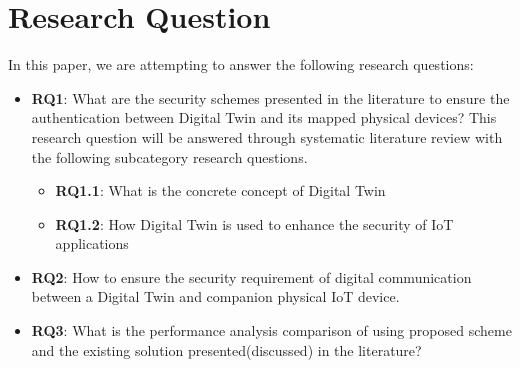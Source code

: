 \section{Research Question}
In this paper, we are attempting to answer the following research questions: 
\begin{itemize}

    \item \textbf{RQ1}: What are the security schemes presented in the literature to ensure the authentication between Digital Twin and its mapped physical devices? 
    This research question will be answered through systematic literature review with the following subcategory research questions.
    \begin{itemize}
        \item{ \textbf{RQ1.1}: What is the concrete concept of Digital Twin}
        \item{ \textbf{RQ1.2}: How Digital Twin is used to enhance the security of IoT applications}
    \end{itemize}

    \item \textbf{RQ2}: How to ensure the security requirement of digital communication between a Digital Twin and companion physical IoT device. 
    
    \item \textbf{RQ3}: What is the performance analysis comparison of using proposed scheme and the existing solution presented(discussed) in the literature? 
\end{itemize}
